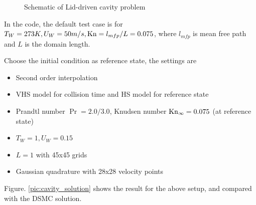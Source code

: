 \documentclass[a4paper]{book}
\begin{document}
\begin{figure}[htb!]
    \centering
    \caption{Schematic of Lid-driven cavity problem}
    \label{pic:cavity}
\end{figure}

In the code, the default test case is for $T_W = 273K, U_W=50m/s, {\rm Kn} = l_{mfp}/{L} = 0.075$, where $l_{mfp}$ is mean free path and $L$ is the domain length.

Choose the initial condition as reference state, the settings are
\begin{itemize}
    \item Second order interpolation
    \item VHS model for collision time and HS model for reference state
    \item Prandtl number $\Pr=2.0/3.0$, Knudsen number ${\rm Kn}_\infty=0.075$ (at reference state)
    \item $T_W=1, U_W=0.15$
    \item $L=1$ with 45x45 grids
    \item Gaussian quadrature with 28x28 velocity points
\end{itemize}

Figure. \ref{pic:cavity_solution} shows the result for the above setup, and compared with the DSMC solution\cite{John2011}.
\end{document}
